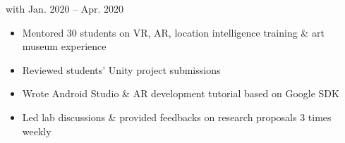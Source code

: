     {{\bodyfontsize \color{body} with} }
    {Jan. 2020 -- Apr. 2020}
    {}{}
\begin{itemize}
    \item Mentored 30 students on VR, AR, location intelligence training \& art museum experience

    \item Reviewed students' Unity project submissions

    \item Wrote Android Studio \& AR development tutorial based on Google SDK

    \item Led lab discussions \& provided feedbacks on research proposals 3 times weekly
\end{itemize}
\dividerSmall



